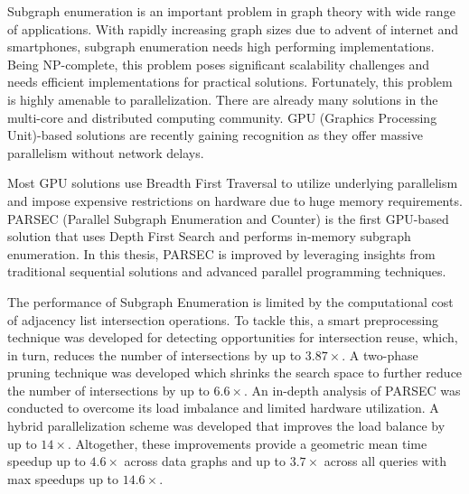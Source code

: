 Subgraph enumeration is an important problem in graph theory with wide range of applications.
With rapidly increasing graph sizes due to advent of internet and smartphones, subgraph enumeration needs high performing implementations.
Being NP-complete, this problem poses significant scalability challenges and needs efficient implementations for practical solutions.
Fortunately, this problem is highly amenable to parallelization.
There are already many solutions in the multi-core and distributed computing community.
GPU (Graphics Processing Unit)-based solutions are recently gaining recognition as they offer massive parallelism without network delays.

Most GPU solutions use Breadth First Traversal to utilize underlying parallelism and impose expensive restrictions on hardware due to huge memory requirements.
PARSEC (Parallel Subgraph Enumeration and Counter) \cite{PARSEC_VD} is the first GPU-based solution that uses Depth First Search and performs in-memory subgraph enumeration.
In this thesis, PARSEC is improved by leveraging insights from traditional sequential solutions and advanced parallel programming techniques.

The performance of Subgraph Enumeration is limited by the computational cost of adjacency list intersection operations.
To tackle this, a smart preprocessing technique was developed for detecting opportunities for intersection reuse, which, in turn, reduces the number of intersections by up to $3.87\times$.
A two-phase pruning technique was developed which shrinks the search space to further reduce the number of intersections by up to $6.6\times$.
An in-depth analysis of PARSEC was conducted to overcome its load imbalance and limited hardware utilization. A hybrid parallelization scheme was developed that improves the load balance by up to $14\times$.
Altogether, these improvements provide a geometric mean time speedup up to $4.6\times$ across data graphs and up to $3.7\times$ across all queries with max speedups up to $14.6\times$.

